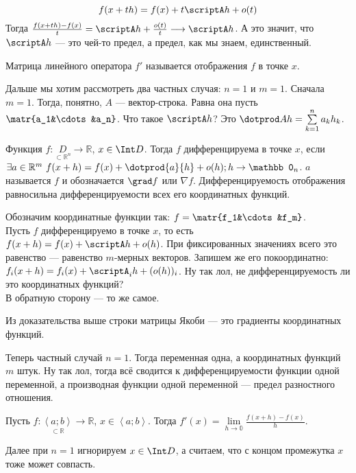\documentclass{article}
\newcommand*{\ab}[1][a;b]{{\left\langle #1\right\rangle}}
\begin{document}
\begin{itemize}
\begin{Proof}
            $$
            f(x+th)=f(x)+t\scriptA h+o(t)
            $$
            Тогда $\frac{f(x+th)-f(x)}t=\scriptA h+\frac{o(t)}t\longrightarrow\scriptA h$. А это значит, что $\scriptA h$ --- это чей-то предел, а предел, как мы знаем, единственный.
        \end{Proof}
        \dfn Матрица линейного оператора $f'$ называется  отображения $f$ в точке $x$.
        \begin{Comment}
            Дальше мы хотим рассмотреть два частных случая: $n=1$ и $m=1$. Сначала $m=1$. Тогда, понятно, $A$ --- вектор-строка. Равна она пусть $\matr{a_1&\cdots&a_n}$. Что такое $\scriptA h$? Это $\dotprod Ah=\sum\limits_{k=1}^na_kh_k$.
        \end{Comment}
        \dfn Функция $f\colon\underset{\subset\mathbb R^n}D\to\mathbb R$, $x\in\Int D$. Тогда $f$ дифференцируема в точке $x$, если $\exists a\in\mathbb R^m~f(x+h)=f(x)+\dotprod{a}{h}+o(h);h\to\mathbb0_n$. $a$ называется  $f$ и обозначается $\grad f$ или $\nabla f$.
        \thm Дифференцируемость отображения равносильна дифференцируемости всех его координатных функций.
        \begin{Proof}
            Обозначим координатные функции так: $f=\matr{f_1&\cdots&f_m}$.\\
            Пусть $f$ дифференцируемо в точке $x$, то есть $f(x+h)=f(x)+\scriptA h+o(h)$. При фиксированных значениях всего это равенство --- равенство $m$-мерных векторов. Запишем же его покоординатно: $f_i(x+h)=f_i(x)+\scriptA_i h+(o(h))_i$. Ну так лол, не дифференцируемость ли это координатных функций?\\
            В обратную сторону --- то же самое.
        \end{Proof}
        \thm Из доказательства выше строки матрицы Якоби --- это градиенты координатных функций.
        \begin{Comment}
            Теперь частный случай $n=1$. Тогда переменная одна, а координатных функций $m$ штук. Ну так лол, тогда всё сводится к дифференцируемости функции одной переменной, а производная функции одной переменной --- предел разностного отношения.
        \end{Comment}
        \dfn Пусть $f\colon\underset{\subset\mathbb R}\ab\to\mathbb R$, $x\in\ab$. Тогда $f'(x)=\lim\limits_{h\to\mathbb0}\frac{f(x+h)-f(x)}h$.
        \begin{Comment}
            Далее при $n=1$ игнорируем $x\in\Int D$, а считаем, что с концом промежутка $x$ тоже может совпасть.

\end{Comment}
\end{itemize}
\end{document}
